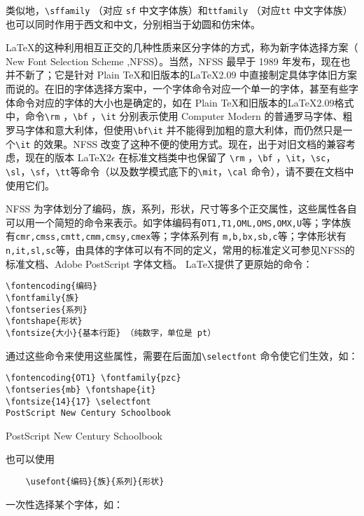 类似地，\verb|\sffamily| （对应 \verb|sf| 中文字体族）和\verb|ttfamily| （对应\verb|tt| 中文字体族）也可以同时作用于西文和中文，分别相当于幼圆和仿宋体。

\LaTeX 的这种利用相互正交的几种性质来区分字体的方式，称为新字体选择方案（ New Font Selection Scheme ,NFSS）。当然，NFSS 最早于 1989 年发布，现在也并不新了；它是针对 Plain \TeX 和旧版本的\LaTeX 2.09 中直接制定具体字体旧方案而说的。在旧的字体选择方案中，一个字体命令对应一个单一的字体，甚至有些字体命令对应的字体的大小也是确定的，如在 Plain \TeX 和旧版本的\LaTeX 2.09格式中，命令\verb|\rm| ，\verb|\bf| ，\verb|\it| 分别表示使用 Computer Modern 的普通罗马字体、粗罗马字体和意大利体，但使用\verb|\bf\it| 并不能得到加粗的意大利体，而仍然只是一个\verb|\it| 的效果。NFSS 改变了这种不便的使用方式。现在，出于对旧文档的兼容考虑，现在的版本 \LaTeX 2$\epsilon$ 在标准文档类中也保留了 \verb|\rm| ，\verb|\bf| ，\verb|\it|，\verb|\sc|，\verb|\sl|，\verb|\sf|，\verb|\tt|等命令（以及数学模式底下的\verb|\mit|，\verb|\cal| 命令），请不要在文档中使用它们。

NFSS 为字体划分了编码，族，系列，形状，尺寸等多个正交属性，这些属性各自可以用一个简短的命令来表示。如字体编码有\verb|OT1,T1,OML,OMS,OMX,U|等；字体族有\verb|cmr,cmss,cmtt,cmm,cmsy,cmex|等；字体系列有 \verb|m,b,bx,sb,c|等；字体形状有\verb|n,it,sl,sc|等，由具体的字体可以有不同的定义，常用的标准定义可参见NFSS的标准文档、Adobe PostScript 字体文档。 \LaTeX 提供了更原始的命令：
\begin{lstlisting}
\fontencoding{编码}
\fontfamily{族}
\fontseries{系列}
\fontshape{形状}
\fontsize{大小}{基本行距} （纯数字，单位是 pt）
\end{lstlisting}

通过这些命令来使用这些属性，需要在后面加\verb|\selectfont| 命令使它们生效，如：

\begin{minipage}[t]{0.45\textwidth}
\begin{lstlisting}
\fontencoding{OT1} \fontfamily{pzc}
\fontseries{mb} \fontshape{it}
\fontsize{14}{17} \selectfont
PostScript New Century Schoolbook
\end{lstlisting}
\end{minipage}
\hfill
\begin{minipage}[t]{0.45\textwidth}
     
     
    \fontsize{14}{17} \selectfont
    PostScript New Century Schoolbook
\end{minipage}

也可以使用
\begin{lstlisting}
    \usefont{编码}{族}{系列}{形状}
\end{lstlisting}
一次性选择某个字体，如：

